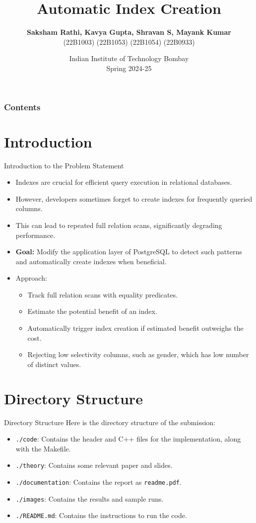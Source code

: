 \documentclass[Serif, 10pt, brown]{beamer}
\title[{CS349 Project}]{\sc Automatic Index Creation}
\author[\ul{Authors}]{{\bf { Saksham Rathi, Kavya Gupta, Shravan S, Mayank Kumar}}\\ {\footnotesize \hspace{0cm} (22B1003) \hspace{1cm} (22B1053) \hspace{0.5cm} (22B1054) \hspace{0.5cm} (22B0933)}}
\institute[UTD]{\sc\small CS349: DataBase and Information Systems\\ Under Prof. Sudarshan and Prof. Suraj}
\date[UCI]{Indian Institute of Technology Bombay \\ Spring 2024-25}
\theoremstyle{example}
\theoremstyle{plain}
\begin{document}
\frame{\titlepage}
%
%


\begin{frame}
	\transblindsvertical
	\frametitle{Contents}
	\tableofcontents[hidesubsections]
\end{frame}

\section{Introduction}
\begin{frame}{Introduction to the Problem Statement}

	\begin{itemize}
		\item Indexes are crucial for efficient query execution in relational databases.
		\item However, developers sometimes forget to create indexes for frequently queried columns.
		\item This can lead to repeated full relation scans, significantly degrading performance.
		\item {\bf Goal:} Modify the application layer of PostgreSQL to detect such patterns and automatically create indexes when beneficial.
		\item Approach:
		\begin{itemize}
			\item Track full relation scans with equality predicates.
			\item Estimate the potential benefit of an index.
			\item Automatically trigger index creation if estimated benefit outweighs the cost.
			\item Rejecting low selectivity columns, such as gender, which has low number of distinct values.
		\end{itemize}
	\end{itemize}
\end{frame}

\section{Directory Structure}
\begin{frame}{Directory Structure}
	Here is the directory structure of the submission:
	\begin{itemize}
		\item \texttt{./code}: Contains the header and C++ files for the implementation, along with the Makefile.
		\item \texttt{./theory}: Contains some relevant paper and slides.
		\item \texttt{./documentation}: Contains the report as \texttt{readme.pdf}.
		\item \texttt{./images}: Contains the results and sample runs.
		\item \texttt{./README.md}: Contains the instructions to run the code.
	\end{itemize}
\end{frame}
\end{document}
